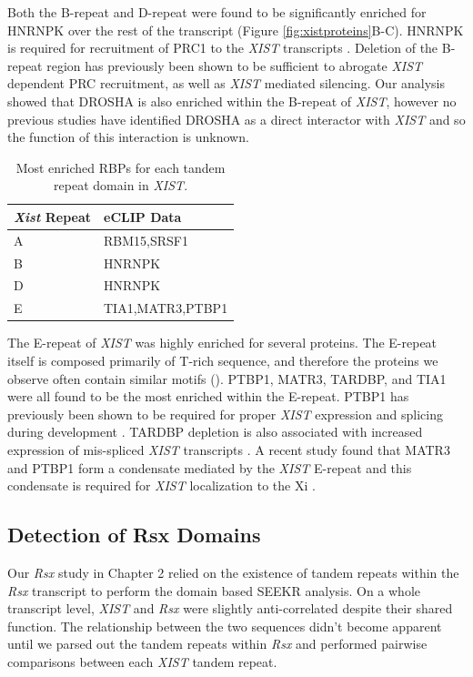Both the B-repeat and D-repeat were found to be significantly enriched for HNRNPK over the rest of the transcript (Figure \ref{fig:xistproteins}B-C). HNRNPK is required for recruitment of PRC1 to the \emph{XIST} transcripts \cite{Pintacuda2017HnRNPKSilencing}. Deletion of the B-repeat region has previously been shown to be sufficient to abrogate \emph{XIST} dependent PRC recruitment, as well as \emph{XIST} mediated silencing. Our analysis showed that DROSHA is also enriched within the B-repeat of \emph{XIST}, however no previous studies have identified DROSHA as a direct interactor with \emph{XIST} and so the function of this interaction is unknown.

\begin{table}[h]
\centering
\begin{tabular}{|l|l|}
\hline 
\emph{Xist} Repeat&eCLIP Data                      \\
\hline 
    A&RBM15,SRSF1    \\
      B & HNRNPK\\
      D  & HNRNPK\\
      E & TIA1,MATR3,PTBP1\\
\hline 
\end{tabular}
\caption{Most enriched RBPs for each tandem repeat domain in \emph{XIST}. }
\label{tbl:eclipscan}
\end{table}

The E-repeat of \emph{XIST} was highly enriched for several proteins. The E-repeat itself is composed primarily of T-rich sequence, and therefore the proteins we observe often contain similar motifs (\cite{Ray2013ARegulation}). PTBP1, MATR3, TARDBP, and TIA1 were all found to be the most enriched within the E-repeat. PTBP1 has previously been shown to be required for proper \emph{XIST} expression and splicing during development \cite{Stork2019DevelopmentalSplicing}. TARDBP depletion is also associated with increased expression of mis-spliced \emph{XIST} transcripts \cite{Stork2019DevelopmentalSplicing}. A recent study found that MATR3 and PTBP1 form a condensate mediated by the \emph{XIST} E-repeat and this condensate is required for \emph{XIST} localization to the Xi \cite{Pandya-Jones2020AnSilencing}. 

\subsection{Detection of Rsx Domains}
Our \emph{Rsx} study in Chapter 2 relied on the existence of tandem repeats within the \emph{Rsx} transcript to perform the domain based SEEKR analysis. On a whole transcript level, \emph{XIST} and \emph{Rsx} were slightly anti-correlated despite their shared function. The relationship between the two sequences didn't become apparent until we parsed out the tandem repeats within \emph{Rsx} and performed pairwise comparisons between each \emph{XIST} tandem repeat. 

